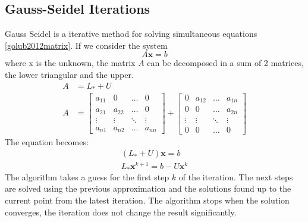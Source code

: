 \documentclass[12pt,a4paper,twoside]{report}
\begin{document}
{\subsection{Gauss-Seidel Iterations} \label{GaussSeidel}
Gauss Seidel is a iterative method for solving simultaneous equations \ref{golub2012matrix}. If we consider the system 
\begin{equation}
A\boldsymbol{x} = b
\end{equation}
where x is the unknown, the matrix $A$ can be decomposed in a sum of 2 matrices, the lower triangular and the upper.
\begin{equation}
	\begin{split}
	A &= L_* +U \\
	A &= \begin{bmatrix}
	a_{11} &  0  & \ldots & 0\\
	a_{21} &  a_{22} & \ldots & 0\\
	\vdots & \vdots & \ddots & \vdots\\
	a_{n1} &  a_{n2}       &\ldots & a_{nn}
	\end{bmatrix}  
	+  \begin{bmatrix}
	0 &  a_{12}  & \ldots & a_{1n}\\
	0 &  0 & \ldots &a_{2n}\\
	\vdots & \vdots & \ddots & \vdots\\
	0 &  0  &\ldots & 0
	\end{bmatrix} 
 	\end{split}
\end{equation}
	The equation becomes:
\begin{equation}
\begin{split}
	(L_*+U)\boldsymbol{x} = b\\
	L_*\boldsymbol{x}^{k+1} = b - U\boldsymbol{x}^{k}
\end{split}
\end{equation}
The algorithm takes a guess for the first step  $k$ of the iteration. The next steps are solved using the previous approximation and the solutions found up to the current point from the latest iteration. The algorithm stops when the solution converges, the iteration does not change the result significantly.

}
\end{document}

